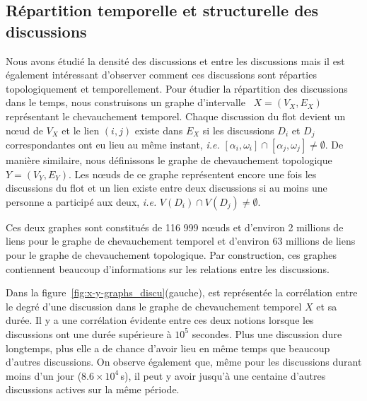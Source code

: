\subsection{Répartition temporelle et structurelle des discussions}

Nous avons étudié la densité des discussions et entre les discussions mais il est également intéressant d'observer comment ces discussions sont réparties topologiquement et temporellement.
Pour étudier la répartition des discussions dans le temps, nous construisons un graphe d'intervalle~\cite{Lekkeikerker} $X=(V_X,E_X)$ représentant le chevauchement temporel.
Chaque discussion du flot devient un n\oe ud de $V_X$ et le lien $(i,j)$ existe dans $E_X$ si les discussions $D_i$ et $D_j$ correspondantes ont eu lieu au même instant, \emph{i.e.} $[\alpha_i, \omega_i] \cap [\alpha_j, \omega_j] \neq \emptyset$.
De manière similaire, nous définissons le graphe de chevauchement topologique $Y=(V_Y,E_Y)$.
Les n\oe uds de ce graphe représentent encore une fois les discussions du flot et un lien existe entre deux discussions si au moins une personne a participé aux deux, \emph{i.e.} $V(D_i) \cap V(D_j) \neq \emptyset$.

Ces deux graphes sont constitués de 116 999 n\oe uds et d'environ 2 millions de liens pour le graphe de chevauchement temporel et d'environ 63 millions de liens pour le graphe de chevauchement topologique.
Par construction, ces graphes contiennent beaucoup d'informations sur les relations entre les discussions.


Dans la figure~\ref{fig:x-y-graphs_discu}(gauche), est représentée la corrélation entre le degré d'une discussion dans le graphe de chevauchement temporel $X$ et sa durée.
Il y a une corrélation évidente entre ces deux notions lorsque les discussions ont une durée supérieure à $10^5$ secondes.
Plus une discussion dure longtemps, plus elle a de chance d'avoir lieu en même temps que beaucoup d'autres discussions.
On observe également que, même pour les discussions durant moins d'un jour ($8.6 \times 10^4$\,s), il peut y avoir jusqu'à une centaine d'autres discussions actives sur la même période.

